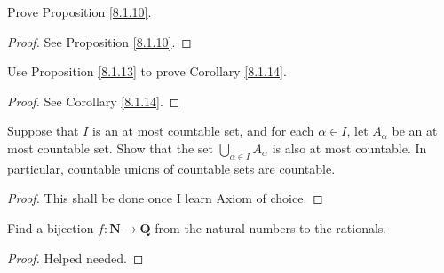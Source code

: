 \begin{exercise}\label{ex 8.1.7}
    Prove Proposition \ref{8.1.10}.
\end{exercise}

\begin{proof}
    See Proposition \ref{8.1.10}.
\end{proof}

\begin{exercise}\label{ex 8.1.8}
    Use Proposition \ref{8.1.13} to prove Corollary \ref{8.1.14}.
\end{exercise}

\begin{proof}
    See Corollary \ref{8.1.14}.
\end{proof}

\begin{exercise}\label{ex 8.1.9}
    Suppose that \(I\) is an at most countable set, and for each \(\alpha \in I\), let \(A_{\alpha}\) be an at most countable set.
    Show that the set \(\bigcup_{\alpha \in I} A_{\alpha}\) is also at most countable.
    In particular, countable unions of countable sets are countable.
\end{exercise}

\begin{proof}
    This shall be done once I learn Axiom of choice.
\end{proof}

\begin{exercise}\label{ex 8.1.10}
    Find a bijection \(f : \mathbf{N} \to \mathbf{Q}\) from the natural numbers to the rationals.
\end{exercise}

\begin{proof}
    Helped needed.
\end{proof}